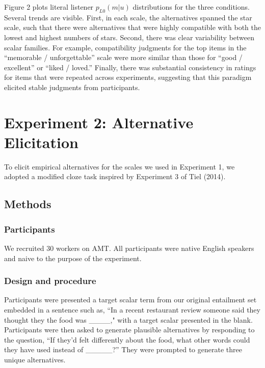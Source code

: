 \documentclass[10pt, letterpaper]{article}
\begin{document}
Figure 2 plots literal listener \(p_{L0}(m|u)\) distributions for the
three conditions. Several trends are visible. First, in each scale, the
alternatives spanned the star scale, such that there were alternatives
that were highly compatible with both the lowest and highest numbers of
stars. Second, there was clear variability between scalar families. For
example, compatibility judgments for the top items in the ``memorable /
unforgettable'' scale were more similar than those for ``good /
excellent'' or ``liked / loved.'' Finally, there was substantial
consistency in ratings for items that were repeated across experiments,
suggesting that this paradigm elicited stable judgments from
participants.

\section{Experiment 2: Alternative
Elicitation}\label{experiment-2-alternative-elicitation}

To elicit empirical alternatives for the scales we used in Experiment 1,
we adopted a modified cloze task inspired by Experiment 3 of Tiel
(2014).

\subsection{Methods}\label{methods-1}

\subsubsection{Participants}\label{participants-1}

We recruited 30 workers on AMT. All participants were native English
speakers and naive to the purpose of the experiment.

\subsubsection{Design and procedure}\label{design-and-procedure-1}

Participants were presented a target scalar term from our original
entailment set embedded in a sentence such as, ``In a recent restaurant
review someone said they thought they the food was \_\_\_\_," with a
target scalar presented in the blank. Participants were then asked to
generate plausible alternatives by responding to the question, ``If
they'd felt differently about the food, what other words could they have
used instead of \_\_\_\_\_?'' They were prompted to generate three
unique alternatives.
\end{document}
